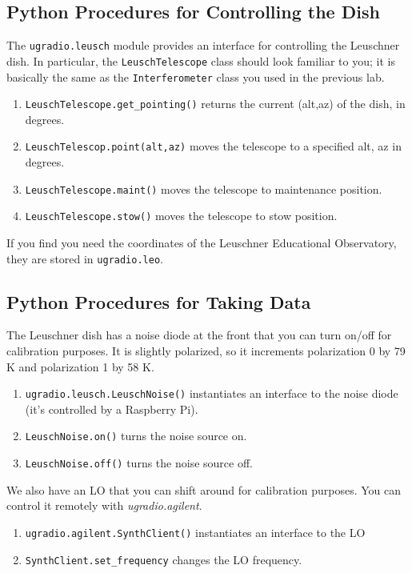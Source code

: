 \documentclass[psfig,preprint]{aastex}
\begin{document}
\subsection{Python Procedures for Controlling the Dish}

\noindent
The {\tt ugradio.leusch} module provides an interface for controlling
the Leuschner dish.  In particular, the {\tt LeuschTelescope} class should
look familiar to you; it is basically the same as the {\tt Interferometer}
class you used in the previous lab.

\begin{enumerate}
\item {\tt LeuschTelescope.get\_pointing()} returns the current (alt,az) of the dish, in degrees.
\item {\tt LeuschTelescop.point(alt,az)} moves the telescope to a specified alt, az in degrees.
\item {\tt LeuschTelescope.maint()} moves the telescope to maintenance position.
\item {\tt LeuschTelescope.stow()} moves the telescope to stow position.
\end{enumerate}

\noindent
If you find you need the coordinates of the Leuschner Educational Observatory, they are stored in
{\tt ugradio.leo}.

\subsection{Python Procedures for Taking Data}

\noindent
The Leuschner dish has a noise diode at the front that you can turn on/off for
calibration purposes. It is slightly polarized, so it increments 
polarization 0 by 79 K and polarization 1 by 58 K.
\begin{enumerate}
\item {\tt ugradio.leusch.LeuschNoise()} instantiates an interface to the noise diode (it's controlled
by a Raspberry Pi).
\item {\tt LeuschNoise.on()} turns the noise source on.
\item {\tt LeuschNoise.off()} turns the noise source off.
\end{enumerate}

We also have an LO that you can shift around for calibration purposes.
You can control it remotely with {\it ugradio.agilent}. 
\begin{enumerate}
\item {\tt ugradio.agilent.SynthClient()} instantiates an interface to the LO
\item {\tt SynthClient.set\_frequency} changes the LO frequency.
\end{enumerate}
\end{document}
